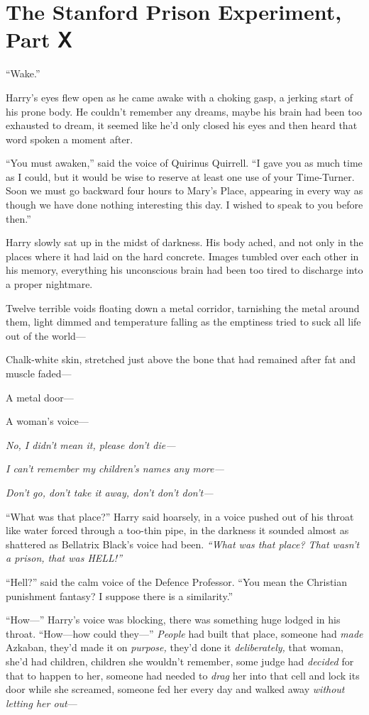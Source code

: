 \chapter{The Stanford Prison Experiment, Part Ⅹ}

``Wake.''

Harry's eyes flew open as he came awake with a choking gasp, a jerking
start of his prone body. He couldn't remember any dreams, maybe his
brain had been too exhausted to dream, it seemed like he'd only closed
his eyes and then heard that word spoken a moment after.

``You must awaken,'' said the voice of Quirinus Quirrell. ``I gave you
as much time as I could, but it would be wise to reserve at least one
use of your Time-Turner. Soon we must go backward four hours to Mary's
Place, appearing in every way as though we have done nothing interesting
this day. I wished to speak to you before then.''

Harry slowly sat up in the midst of darkness. His body ached, and not
only in the places where it had laid on the hard concrete. Images
tumbled over each other in his memory, everything his unconscious brain
had been too tired to discharge into a proper nightmare.

Twelve terrible voids floating down a metal corridor, tarnishing the
metal around them, light dimmed and temperature falling as the emptiness
tried to suck all life out of the world---

Chalk-white skin, stretched just above the bone that had remained after
fat and muscle faded---

A metal door---

A woman's voice---

\emph{No, I didn't mean it, please don't die---}

\emph{I can't remember my children's names any more---}

\emph{Don't go, don't take it away, don't don't don't---}

``What was that place?'' Harry said hoarsely, in a voice pushed out of
his throat like water forced through a too-thin pipe, in the darkness it
sounded almost as shattered as Bellatrix Black's voice had been.
\emph{``What was that place? That wasn't a prison, that was HELL!''}

``Hell?'' said the calm voice of the Defence Professor. ``You mean the
Christian punishment fantasy? I suppose there is a similarity.''

``How---'' Harry's voice was blocking, there was something huge lodged
in his throat. ``How---how could they---'' \emph{People} had built that
place, someone had \emph{made} Azkaban, they'd made it on
\emph{purpose,} they'd done it \emph{deliberately,} that woman, she'd
had children, children she wouldn't remember, some judge had
\emph{decided} for that to happen to her, someone had needed to
\emph{drag} her into that cell and lock its door while she screamed,
someone fed her every day and walked away \emph{without letting her
out}---


